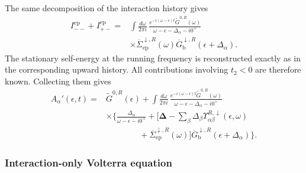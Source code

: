 \documentclass[
 reprint,
 superscriptaddress,
 amsmath,amssymb,
 aps,prb,
 longbibliography,
 floatfix
]{revtex4-2}
\newcommand{\ep}{\mathrm{ep}}
\newcommand{\barSigma}{\overline{\Sigma}}
\begin{document}
The same decomposition of the interaction history gives
\begin{equation*}
\begin{aligned}
I_{--}^{\ep}
+
I_{+-}^{\ep}
={}&
\int\frac{d\omega}{2\pi i}\,
\frac{
e^{-i(\omega-\epsilon)t}
\widetilde G^{0,R}(\omega)}
{\omega-\epsilon-\Delta_\alpha-i0^+}
\\
&\times
\barSigma_{\ep}^{\downarrow,R}(\omega)
\overline G_{\mathrm b}^{\downarrow,R}
(\epsilon+\Delta_\alpha).
\end{aligned}
\end{equation*}
The stationary self-energy at the running frequency is reconstructed exactly as in the corresponding upward history. All contributions involving $t_2<0$ are therefore known. Collecting them gives
\begin{equation}
\begin{aligned}
A_\alpha'(\epsilon,t)
={}&
\widetilde G^{0,R}(\epsilon)
+
\int\frac{d\omega}{2\pi i}\,
\frac{
e^{-i(\omega-\epsilon)t}
\widetilde G^{0,R}(\omega)}
{\omega-\epsilon-\Delta_\alpha-i0^+}
\\
&\times
\Bigg\{
\frac{\Delta_\alpha}
{\omega-\epsilon-i0^+}
+
\Bigg[
\bm\Delta
-
\sum_\beta
\Delta_\beta
\Upsilon_{\alpha\beta}^{R,\downarrow}
(\epsilon,\omega)
\\
&\qquad\qquad+
\barSigma_{\ep}^{\downarrow,R}(\omega)
\Bigg]
\overline G_{\mathrm b}^{\downarrow,R}
(\epsilon+\Delta_\alpha)
\Bigg\}.
\end{aligned}
\label{eq:Aprime-down}
\end{equation}

\subsubsection{Interaction-only Volterra equation}
\end{document}

